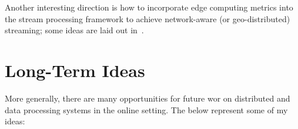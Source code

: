 

Another interesting direction is how to incorporate edge computing metrics into the stream processing framework to achieve network-aware (or geo-distributed) streaming; some ideas are laid out in~.

\section{Long-Term Ideas}

More generally, there are many opportunities for future wor on distributed and data processing systems in the online setting.
The below represent some of my ideas:

